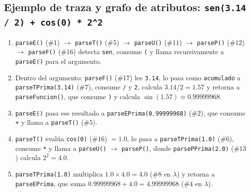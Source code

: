 \documentclass[10pt,a4paper]{article}
\begin{document}
\subsection*{Ejemplo de traza y grafo de atributos: \texttt{sen(3.14 / 2) + cos(0) * 2\^{}2}}
\begin{enumerate}
    \item \texttt{parseE()} ($\#1$) $\rightarrow$ \texttt{parseT()} ($\#5$) $\rightarrow$ \texttt{parseU()} ($\#11$) $\rightarrow$ \texttt{parseP()} ($\#12$) $\rightarrow$ \texttt{parseF()} ($\#16$) detecta \texttt{sen}, consume \texttt{(} y llama recursivamente a \texttt{parseE()} para el argumento.
    \item Dentro del argumento: \texttt{parseF()} ($\#17$) lee \texttt{3.14}, lo pasa como \texttt{acumulado} a \texttt{parseTPrima(3.14)} ($\#7$), consume \texttt{/} y \texttt{2}, calcula $3.14 / 2 = 1.57$ y retorna a \texttt{parseFuncion()}, que consume \texttt{)} y calcula $\sin(1.57) \approx 0.99999968$.
    \item \texttt{parseE()} pasa ese resultado a \texttt{parseEPrima(0.99999968)} ($\#2$), que consume \texttt{+} y llama a \texttt{parseT()} ($\#5$).
    \item \texttt{parseT()} evalúa \texttt{cos(0)} ($\#16$) $= 1.0$, lo pasa a \texttt{parseTPrima(1.0)} ($\#6$), consume \texttt{*} y llama a \texttt{parseU()} $\rightarrow$ \texttt{parseP()}, donde \texttt{parsePPrima(2.0)} ($\#13$) calcula $2^2 = 4.0$.
    \item \texttt{parseTPrima(1.0)} multiplica $1.0 \times 4.0 = 4.0$ ($\#8$ en $\lambda$) y retorna a \texttt{parseEPrima}, que suma $0.99999968 + 4.0 = 4.99999968$ ($\#4$ en $\lambda$).
\end{enumerate}
\end{document}
